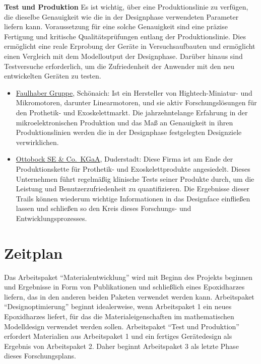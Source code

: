 \documentclass[
  oneside]{book}
\begin{document}
\textbf{Test und Produktion} Es ist wichtig, über eine Produktionslinie zu verfügen, die dieselbe Genauigkeit wie die in der Designphase verwendeten Parameter liefern kann. Voraussetzung für eine solche Genauigkeit sind eine präzise Fertigung und kritische Qualitätsprüfungen entlang der Produktionslinie. Dies ermöglicht eine reale Erprobung der Geräte in Versuchsaufbauten und ermöglicht einen Vergleich mit dem Modelloutput der Designphase. Darüber hinaus sind Testversuche erforderlich, um die Zufriedenheit der Anwender mit den neu entwickelten Geräten zu testen.

\begin{itemize}
\item
  \href{https://www.faulhaber.com/en/markets/medical/exoskeletons-prosthetics/}{Faulhaber Gruppe}, Schönaich: Ist ein Hersteller von Hightech-Miniatur- und Mikromotoren, darunter Linearmotoren, und sie aktiv Forschungslösungen für den Prothetik- und Exoskelettmarkt. Die jahrzehntelange Erfahrung in der mikroelektronischen Produktion und das Maß an Genauigkeit in ihren Produktionslinien werden die in der Designphase festgelegten Designziele verwirklichen.
\item
  \href{https://www.ottobock.com/de-de/startseite}{Ottobock SE \& Co.~KGaA}, Duderstadt: Diese Firma ist am Ende der Produktionskette für Prothetik- und Exoskelettprodukte angesiedelt. Dieses Unternehmen führt regelmäßig klinische Tests seiner Produkte durch, um die Leistung und Benutzerzufriedenheit zu quantifizieren. Die Ergebnisse dieser Trails können wiederum wichtige Informationen in das Designface einfließen lassen und schließen so den Kreis dieses Forschungs- und Entwicklungsprozesses.
\end{itemize}

\hypertarget{zeitplan}{%
\section{Zeitplan}\label{zeitplan}}

Das Arbeitspaket ``Materialentwicklung'' wird mit Beginn des Projekts beginnen und Ergebnisse in Form von Publikationen und schließlich eines Epoxidharzes liefern, das in den anderen beiden Paketen verwendet werden kann. Arbeitspaket ``Designoptimierung'' beginnt idealerweise, wenn Arbeitspaket 1 ein neues Epoxidharzes liefert, für das die Materialeigenschaften im mathematischen Modelldesign verwendet werden sollen. Arbeitspaket ``Test und Produktion'' erfordert Materialien aus Arbeitspaket 1 und ein fertiges Gerätedesign als Ergebnis von Arbeitspaket 2. Daher beginnt Arbeitspaket 3 als letzte Phase dieses Forschungsplans.
\end{document}

